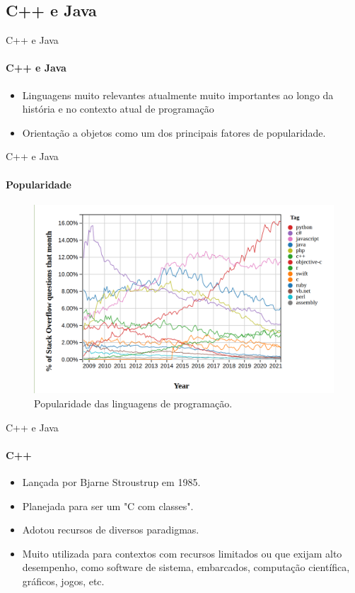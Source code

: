 \subsection{C++ e Java}

\begin{frame}{C++ e Java}
\framesubtitle{C++ e Java}
\begin{itemize}
    \item Linguagens muito relevantes atualmente muito importantes ao longo da história e no contexto atual de programação
    \item Orientação a objetos como um dos principais fatores de popularidade.

\end{itemize} 
\end{frame}

\begin{frame}{C++ e Java}
\framesubtitle{Popularidade}
    \begin{figure}
    	\centering
    	\includegraphics[width=0.9\linewidth]{img/image_pop.png}
    	\caption{Popularidade das linguagens de programação.\cite{stackoverflow}}
    	\label{fig:popularidade}
    \end{figure}
\end{frame}



\begin{frame}{C++ e Java}
\framesubtitle{C++}
\begin{itemize}
    \item Lançada por Bjarne Stroustrup em 1985.
    \item Planejada para ser um "C com classes".
    \item Adotou recursos de diversos paradigmas.
    \item Muito utilizada para contextos com recursos limitados ou que exijam alto desempenho, como software de sistema, embarcados, computação científica, gráficos, jogos,  etc.
\end{itemize} 
\end{frame}


